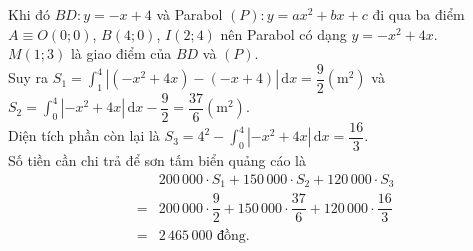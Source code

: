 \begin{bt}
{\begin{center}
\begin{tikzpicture}[scale=1,font=\footnotesize,line join=round,line cap=round,>=stealth]
				\end{tikzpicture}
		\end{center}
		Khi đó $BD\colon y=-x+4$ và Parabol $(P)\colon y=ax^2+bx+c$ đi qua ba điểm $A\equiv O(0;0)$, $B(4;0)$, $I(2;4)$ nên Parabol có dạng $y=-x^2+4x$.\\ 
		$M(1;3)$ là  giao điểm của $BD$ và $(P)$.\\
		 Suy ra $S_1=\displaystyle\int_{1}^{4} \left|(-x^2+4x)-(-x+4)\right| \mathrm{\,d}x=\dfrac{9}{2}\left(\mathrm{m}^2\right)$ và $S_2=\displaystyle\int_{0}^{4} |-x^2+4x| \mathrm{\,d}x-\dfrac{9}{2}=\dfrac{37}{6}\left(\mathrm{m}^2\right)$.\\
		Diện tích  phần còn lại là $S_3=4^2-\displaystyle\int_{0}^{4} |-x^2+4x| \mathrm{\,d}x=\dfrac{16}{3}$.\\
		Số tiền  cần chi trả để sơn tấm biển quảng cáo là
		\begin{eqnarray*}
			&&200\,000\cdot S_1+150\,000\cdot  S_2+120\,000\cdot S_3 \\
			&=&200\,000\cdot \dfrac{9}{2}+150\,000\cdot \dfrac{37}{6}+120\,000\cdot \dfrac{16}{3}\\ 
			&=&2\,465\,000 \text{ đồng}. 
		\end{eqnarray*}
	} 
\end{bt}

